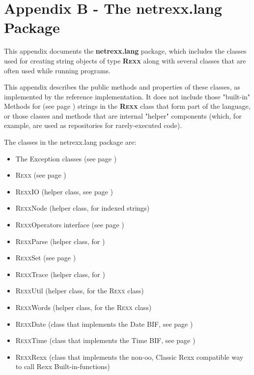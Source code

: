 \chapter{Appendix B - The netrexx.lang Package}\label{refappc}
 
This appendix documents the \textbf{netrexx.lang}
package, which includes the classes used for creating string objects of
type \textbf{R\textsc{exx}} along with several classes that are often used
while running \nr{} programs.
 
This appendix describes the public methods and properties of these
classes, as implemented by the reference implementation.  It does not
include those "built-in"  Methods for \nr{} (see page \pageref{refbmeth}) 
strings in the \textbf{R\textsc{exx}} class that form part of the
\nr{} language, or those classes and methods that are internal
"helper" components (which, for example, are used as
repositories for rarely-executed code).
 
The classes in the netrexx.lang package are:
\begin{itemize}
\item The  Exception classes (see page \pageref{refnlexcep}) 
\item  R\textsc{exx} (see page \pageref{refnlrexx}) 
\item R\textsc{exx}IO (helper class, see page \pageref{refrexxio})
\item R\textsc{exx}Node (helper class, for indexed strings)
\item  R\textsc{exx}Operators interface (see page \pageref{refnlrops}) 
\item R\textsc{exx}Parse (helper class, for )
\item  R\textsc{exx}Set (see page \pageref{refnlrset}) 
\item R\textsc{exx}Trace (helper class, for )
\item R\textsc{exx}Util (helper class, for the R\textsc{exx} class)
\item R\textsc{exx}Words (helper class, for the R\textsc{exx} class)
\item R\textsc{exx}Date (class that implements the Date BIF, see page
  \pageref{refrexxdate})
\item R\textsc{exx}Time (class that implements the Time BIF, see page
  \pageref{refrexxtime})
\item R\textsc{exx}Rexx (class that implements the non-oo, Classic
  Rexx compatible way to call
  Rexx Built-in-functions)
\end{itemize}
